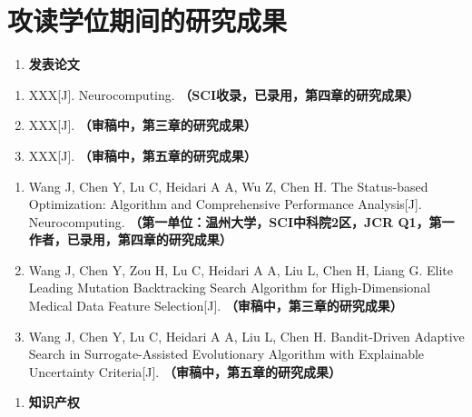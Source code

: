 \documentclass{wzuthesis} %
\def\blind{}       %
\begin{document}
    \newpage
\fi
\chapter{攻读学位期间的研究成果}

\begin{enumerate}[label=\arabic*.]
    \item \textbf{发表论文}
\end{enumerate}

\ifdefined\blind  %
    \begin{enumerate}
        \renewcommand{\labelenumi}{[\arabic{enumi}]}
        \setlength{\itemindent}{0em}
        \setlength{\labelsep}{0.5em}

        \item XXX[J]. Neurocomputing. \textbf{（SCI收录，已录用，第四章的研究成果）}
        \item XXX[J]. \textbf{（审稿中，第三章的研究成果）}
        \item XXX[J]. \textbf{（审稿中，第五章的研究成果）}
    \end{enumerate}
\else
    \begin{enumerate}
        \renewcommand{\labelenumi}{[\arabic{enumi}]}
        \setlength{\itemindent}{0em}
        \setlength{\labelsep}{0.5em}

        \item Wang J, Chen Y, Lu C, Heidari A A, Wu Z, Chen H. The Status-based Optimization: Algorithm and Comprehensive Performance Analysis[J]. Neurocomputing. \textbf{（第一单位：温州大学，SCI中科院2区，JCR Q1，第一作者，已录用，第四章的研究成果）}
        \item Wang J, Chen Y, Zou H, Lu C, Heidari A A, Liu L, Chen H, Liang G. Elite Leading Mutation Backtracking Search Algorithm for High-Dimensional Medical Data Feature Selection[J]. \textbf{（审稿中，第三章的研究成果）}
        \item Wang J, Chen Y, Lu C, Heidari A A, Liu L, Chen H. Bandit-Driven Adaptive Search in Surrogate-Assisted Evolutionary Algorithm with Explainable Uncertainty Criteria[J]. \textbf{（审稿中，第五章的研究成果）}
    \end{enumerate}
\fi

\ifdefined\blind
\else
    \begin{enumerate}[label=\arabic*., start=2]
        \item \textbf{知识产权}
    \end{enumerate}
\end{document}
